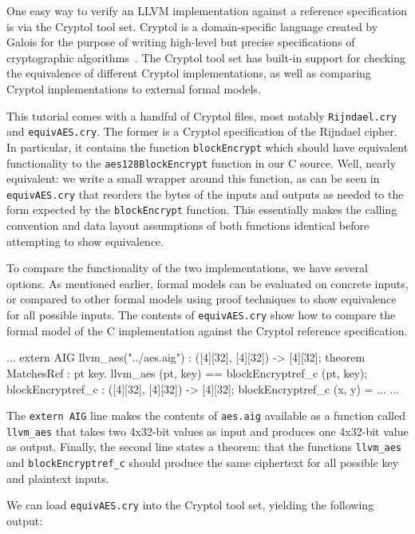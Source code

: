 \documentclass[11pt]{article}
\begin{document}
One easy way to verify an LLVM implementation against a reference
specification is via the Cryptol tool set. Cryptol is a domain-specific
language created by Galois for the purpose of writing high-level but
precise specifications of cryptographic algorithms~\cite{cryptol}. The
Cryptol tool set has built-in support for checking the equivalence of
different Cryptol implementations, as well as comparing Cryptol
implementations to external formal models.

This tutorial comes with a handful of Cryptol files, most notably
\texttt{Rijndael.cry} and \texttt{equivAES.cry}.  The former is a
Cryptol specification of the Rijndael cipher.  In particular, it
contains the function \texttt{blockEncrypt} which should have equivalent
functionality to the \texttt{aes128BlockEncrypt} function in our C
source.  Well, nearly equivalent: we write a small wrapper around this
function, as can be seen in \texttt{equivAES.cry} that reorders the
bytes of the inputs and outputs as needed to the form expected by the
\texttt{blockEncrypt} function.  This essentially makes the calling
convention and data layout assumptions of both functions identical
before attempting to show equivalence.

To compare the functionality of the two implementations, we have several
options. As mentioned earlier, formal models can be evaluated on
concrete inputs, or compared to other formal models using proof
techniques to show equivalence for all possible inputs. The contents of
\texttt{equivAES.cry} show how to compare the formal model of the C
implementation against the Cryptol reference specification.

\begin{code}
...
extern AIG llvm_aes("../aes.aig") : ([4][32], [4][32]) -> [4][32];
theorem MatchesRef : {pt key}. llvm_aes (pt, key) == blockEncryptref_c (pt, key);
blockEncryptref_c : ([4][32], [4][32]) -> [4][32];
blockEncryptref_c (x, y) = ...
...
\end{code}

The \texttt{extern AIG} line makes the contents of \texttt{aes.aig}
available as a function called \texttt{llvm\_aes} that takes two
4x32-bit values as input and produces one 4x32-bit value as
output. Finally, the second line states a theorem: that the functions
\texttt{llvm\_aes} and \texttt{blockEncryptref\_c} should produce the
same ciphertext for all possible key and plaintext inputs.

We can load \texttt{equivAES.cry} into the Cryptol tool set, yielding
the following output:
\end{document}
